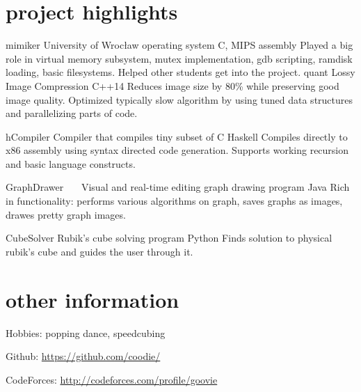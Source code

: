 \documentclass[]{twentysecondcv}
\begin{document}
\section{project highlights}
\begin{twenty}
	\twentyitem
	{mimiker}
	{University of Wrocław operating system}
	{C, MIPS assembly}
	{ Played a big role in virtual memory subsystem, mutex implementation, gdb scripting, ramdisk loading, basic filesystems. Helped other students get into the project. }
	\twentyitem
	{quant}
	{Lossy Image Compression}
	{C++14}
	{Reduces image size by 80\% while preserving good image quality.
	Optimized typically slow algorithm by using tuned data structures and parallelizing parts of code.
	}
	
	\twentyitem
	{hCompiler}
	{Compiler that compiles tiny subset of C}
	{Haskell}
	{Compiles directly to x86 assembly using syntax directed code generation. Supports working recursion and basic language constructs. }
	
	\twentyitem
	{GraphDrawer\ \ \ }
	{Visual and real-time editing graph drawing program}
	{Java}
	{Rich in functionality: performs various algorithms on graph, saves graphs as images, drawes pretty graph images.}
	
	\twentyitem
	{CubeSolver}
	{Rubik's cube solving program}
	{Python}
	{Finds solution to physical rubik's cube and guides the user through it. }
	
\end{twenty}


\section{other information}
Hobbies: popping dance, speedcubing

Github: \url{https://github.com/coodie/}

CodeForces: \url{http://codeforces.com/profile/goovie}


\end{document}
